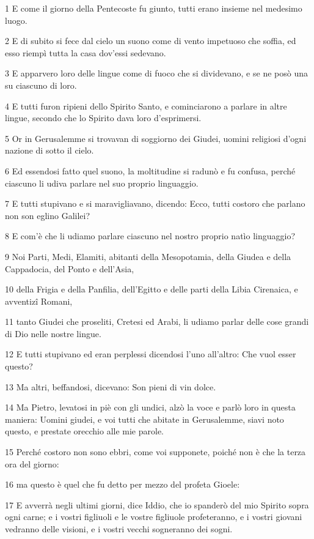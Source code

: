 \par 1 E come il giorno della Pentecoste fu giunto, tutti erano insieme nel medesimo luogo.
\par 2 E di subito si fece dal cielo un suono come di vento impetuoso che soffia, ed esso riempì tutta la casa dov'essi sedevano.
\par 3 E apparvero loro delle lingue come di fuoco che si dividevano, e se ne posò una su ciascuno di loro.
\par 4 E tutti furon ripieni dello Spirito Santo, e cominciarono a parlare in altre lingue, secondo che lo Spirito dava loro d'esprimersi.
\par 5 Or in Gerusalemme si trovavan di soggiorno dei Giudei, uomini religiosi d'ogni nazione di sotto il cielo.
\par 6 Ed essendosi fatto quel suono, la moltitudine si radunò e fu confusa, perché ciascuno li udiva parlare nel suo proprio linguaggio.
\par 7 E tutti stupivano e si maravigliavano, dicendo: Ecco, tutti costoro che parlano non son eglino Galilei?
\par 8 E com'è che li udiamo parlare ciascuno nel nostro proprio natìo linguaggio?
\par 9 Noi Parti, Medi, Elamiti, abitanti della Mesopotamia, della Giudea e della Cappadocia, del Ponto e dell'Asia,
\par 10 della Frigia e della Panfilia, dell'Egitto e delle parti della Libia Cirenaica, e avventizî Romani,
\par 11 tanto Giudei che proseliti, Cretesi ed Arabi, li udiamo parlar delle cose grandi di Dio nelle nostre lingue.
\par 12 E tutti stupivano ed eran perplessi dicendosi l'uno all'altro: Che vuol esser questo?
\par 13 Ma altri, beffandosi, dicevano: Son pieni di vin dolce.
\par 14 Ma Pietro, levatosi in piè con gli undici, alzò la voce e parlò loro in questa maniera: Uomini giudei, e voi tutti che abitate in Gerusalemme, siavi noto questo, e prestate orecchio alle mie parole.
\par 15 Perché costoro non sono ebbri, come voi supponete, poiché non è che la terza ora del giorno:
\par 16 ma questo è quel che fu detto per mezzo del profeta Gioele:
\par 17 E avverrà negli ultimi giorni, dice Iddio, che io spanderò del mio Spirito sopra ogni carne; e i vostri figliuoli e le vostre figliuole profeteranno, e i vostri giovani vedranno delle visioni, e i vostri vecchi sogneranno dei sogni.
